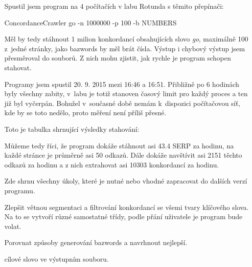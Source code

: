 
Spustil jsem program na 4 počítačích v labu Rotunda s těmito přepínači: 

ConcordanceCrawler go -n 1000000 -p 100 -b NUMBERS 

Měl by tedy stáhnout 1 milion konkordancí obsahujících slovo {\it go},
maximálně 100 z~jedné stránky, jako bazwords by měl brát čísla. Výstup
i chybový výstup jsem přesměroval do souborů. Z nich mohu zjistit, jak
rychle je program schopen stahovat.

Programy jsem spustil 20. 9. 2015 mezi 16:46 a 16:51. Přibližně po
6 hodinách byly všechny zabity, v~labu je totiž stanoven časový limit pro
každý proces a ten již byl vyčerpán. Bohužel v~současné době nemám
k~dispozici počítačovou síť, kde by se toto nedělo, proto měření není
příliš přesné.

Toto je tabulka shrnující výsledky stahování:
\bigskip


\bigskip

Můžeme tedy říci, že program dokáže stáhnout asi 43.4 SERP za hodinu, na
každé stránce je průměrně asi 50 odkazů. Dále dokáže navštívit asi 2151 těchto
odkazů za hodinu a z nich extrahovat asi 10303 konkordancí za hodinu.


Zde shrnu všechny úkoly, které je nutné nebo vhodné zapracovat do dalších
verzí programu.

\bigskip

\itemize{--}
\:
Zlepšit větnou segmentaci a filtrování konkordancí se všemi tvary klíčového
slova. Na to se vytvoří různé samostatné třídy, podle přání uživatele je
program bude volat.

\: 
Porovnat způsoby generování bazwords a navrhnout nejlepší.

\:
 cílové slovo ve výstupním souboru.

